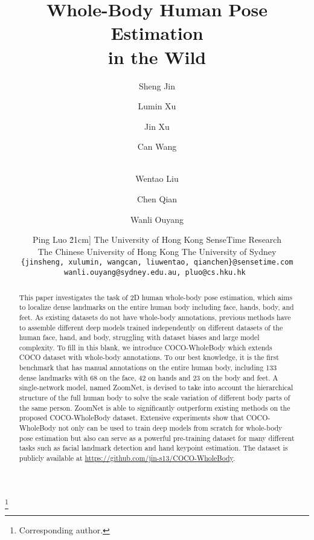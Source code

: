 \documentclass[runningheads]{llncs}
\newcommand\blfootnote[1]{\begingroup
	\renewcommand\thefootnote{}\footnote{#1}\addtocounter{footnote}{-1}\endgroup
}
\begin{document}
\pagestyle{headings}
	\mainmatter
	\def\ECCVSubNumber{768}  

	\title{Whole-Body Human Pose Estimation \\in the Wild}
	
\begin{comment}
	\titlerunning{ECCV-20 submission ID \ECCVSubNumber} 
	\authorrunning{ECCV-20 submission ID \ECCVSubNumber} 
	\author{Anonymous ECCV submission}
	\institute{Paper ID \ECCVSubNumber}
	\end{comment}


\author{Sheng Jin \and
		Lumin Xu \and
		Jin Xu \and
		Can Wang \and \\
		Wentao Liu\inst{2\dagger} \and
		Chen Qian \and Wanli Ouyang \and Ping Luo \.21cm]
		 The University of Hong Kong \quad
		 SenseTime Research \\
		 The Chinese University of Hong Kong \quad
		 The University of Sydney \\
		\tt\small \{jinsheng, xulumin, wangcan, liuwentao, qianchen\}@sensetime.com \quad
		wanli.ouyang@sydney.edu.au, pluo@cs.hku.hk  }
\institute{}
	
	\maketitle
	
	\blfootnote{Corresponding author.}
	
	\begin{abstract}
		This paper investigates the task of 2D human whole-body pose estimation, which aims to localize dense landmarks on the entire human body including face, hands, body, and feet. As existing datasets do not have whole-body annotations, previous methods have to assemble different deep models trained independently on different datasets of the human face, hand, and body, struggling with dataset biases and large model complexity. To fill in this blank, we introduce COCO-WholeBody which extends COCO dataset with whole-body annotations. To our best knowledge, it is the first benchmark that has manual annotations on the entire human body, including 133 dense landmarks with 68 on the face, 42 on hands and 23 on the body and feet. A single-network model, named ZoomNet, is devised  to take into account the hierarchical structure of the full human body to solve the scale variation of different body parts of the same person. ZoomNet is able to significantly outperform existing methods on the proposed COCO-WholeBody dataset. Extensive experiments show that COCO-WholeBody not only can be used to train deep models from scratch for whole-body pose estimation but also can serve as a powerful pre-training dataset for many different tasks such as facial landmark detection and hand keypoint estimation. The dataset is publicly available at \url{https://github.com/jin-s13/COCO-WholeBody}.
	\end{abstract}
	
\end{document}
